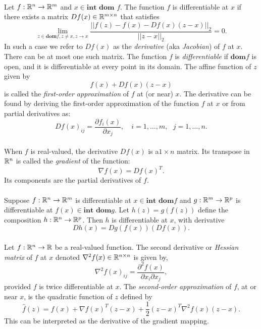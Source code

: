 \documentclass[letterpaper,12pt,oneside,onecolumn]{article}
\begin{document}
\paragraph{}
Let $f: \mathbb{R}^n \rightarrow \mathbb{R}^m$ and $x \in \textbf{int dom } f$. The function $f$ is differentiable at $x$ if there exists a matrix $Df(x) \in \mathbb{R}^{m \times n}$ that satisfies
$$ \lim_{z \in \textbf{dom} f, z\neq x, z\rightarrow x} \frac{||f(z) - f(x) - Df(x)(z-x)||_2}{||z-x||_2} = 0.$$
In such a case we refer to $Df(x)$ as the {\it derivative} (aka {\it Jacobian}) of $f$ at $x$. There can be at most one such matrix. The function $f$ is {\it differentiable } if $\textbf{dom} f$ is open, and it is differentiable at every point in its domain. The affine function of $z$ given by
$$f(x) + Df(x)(z-x)$$
is called the {\it first-order approximation} of $f$ at (or near) $x$.  The derivative can be found by deriving the first-order approximation of the function $f$ at $x$ or from partial derivatives as:
$$Df(x)_{ij} = \frac{\partial f_i(x)}{\partial x_j}, \quad i=1,\dots,m,\ \ \ j=1,\dots,n.$$
\paragraph{}
When $f$ is real-valued, the derivative $Df(x)$ is a$1\times n$ matrix. Its transpose in $\mathbb{R}^n$ is called the {\it gradient} of the function:
$$\nabla f(x) = Df(x)^T.$$
Its components are the partial derivatives of $f$.
\paragraph{}
Suppose $f: \mathbb{R}^n \rightarrow \mathbb{R}^m$ is differentiable at $x \in \textbf{int dom} f$ and $g: \mathbb{R}^m \rightarrow \mathbb{R}^p$ is differentiable at $f(x) \in \textbf{int dom}g$. Let $h(z) = g(f(z))$ define the composition $h: \mathbb{R}^n \rightarrow \mathbb{R}^p$. Then $h$ is differentiable at $x$, with derivative
$$Dh(x) = Dg(f(x))(Df(x)).$$
\paragraph{}
Let $f: \mathbb{R}^n \rightarrow \mathbb{R}$ be a real-valued function. The second derivative or {\it Hessian matrix} of $f$ at $x$ denoted $\nabla^2 f(x) \in \mathbb{R}^{n \times n}$ is given by,
$$\nabla^2f(x)_{ij} = \frac{\partial^2f(x)}{\partial x_i \partial x_j},$$
provided $f$ is twice differentiable at $x$. The {\it second-order approximation} of $f$, at or near $x$, is the quadratic function of $z$ defined by
$$\hat{f}(z) = f(x) + \nabla f(x)^T(z-x) + \frac{1}{2}(z-x)^T\nabla^2 f(x)(z-x).$$
This can be interpreted as the derivative of the gradient mapping.
\end{document}
